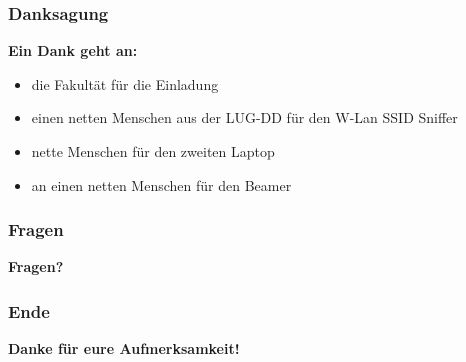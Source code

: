 \documentclass[12pt, table]{beamer}
\begin{document}
  \begin{frame}
    \frametitle{Danksagung}
    \begin{center}
      \textbf{Ein Dank geht an:}
      \begin{itemize}
        \item die Fakultät für die Einladung
        \item einen netten Menschen aus der LUG-DD für den W-Lan SSID Sniffer
        \item nette Menschen für den zweiten Laptop
        \item an einen netten Menschen für den Beamer
      \end{itemize}
    \end{center}
  \end{frame}
  
  \begin{frame}
    \frametitle{Fragen}
    \begin{center}
      \textbf{Fragen?}
    \end{center}
  \end{frame}
  
  \begin{frame}
    \frametitle{Ende}
    \begin{center}
      \textbf{Danke für eure Aufmerksamkeit!}
    \end{center}
  \end{frame}
  
\end{document}
